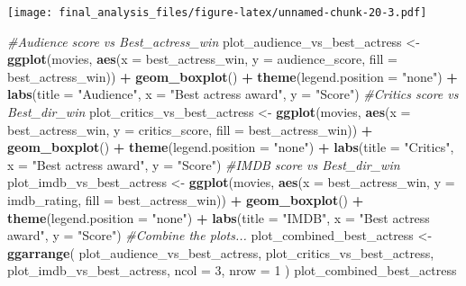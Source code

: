 \documentclass[]{article}
\newenvironment{Shaded}{\begin{snugshade}}{\end{snugshade}}
\newcommand{\CommentTok}[1]{\textcolor[rgb]{0.56,0.35,0.01}{\textit{#1}}}
\newcommand{\DataTypeTok}[1]{\textcolor[rgb]{0.13,0.29,0.53}{#1}}
\newcommand{\DecValTok}[1]{\textcolor[rgb]{0.00,0.00,0.81}{#1}}
\newcommand{\KeywordTok}[1]{\textcolor[rgb]{0.13,0.29,0.53}{\textbf{#1}}}
\newcommand{\NormalTok}[1]{#1}
\newcommand{\OperatorTok}[1]{\textcolor[rgb]{0.81,0.36,0.00}{\textbf{#1}}}
\newcommand{\StringTok}[1]{\textcolor[rgb]{0.31,0.60,0.02}{#1}}
\begin{document}
\texttt{[image: final\_analysis\_files/figure-latex/unnamed-chunk-20-3.pdf]}

\begin{Shaded}
\begin{Highlighting}[]
\CommentTok{#Audience score vs Best_actress_win}
\NormalTok{plot_audience_vs_best_actress <-}
\StringTok{  }\KeywordTok{ggplot}\NormalTok{(movies,}
         \KeywordTok{aes}\NormalTok{(}\DataTypeTok{x =}\NormalTok{ best_actress_win, }\DataTypeTok{y =}\NormalTok{ audience_score, }\DataTypeTok{fill =}\NormalTok{ best_actress_win)) }\OperatorTok{+}
\StringTok{  }\KeywordTok{geom_boxplot}\NormalTok{() }\OperatorTok{+}\StringTok{ }\KeywordTok{theme}\NormalTok{(}\DataTypeTok{legend.position =} \StringTok{"none"}\NormalTok{) }\OperatorTok{+}\StringTok{ }\KeywordTok{labs}\NormalTok{(}\DataTypeTok{title =} \StringTok{"Audience"}\NormalTok{, }\DataTypeTok{x =} \StringTok{"Best actress award"}\NormalTok{, }\DataTypeTok{y =} \StringTok{"Score"}\NormalTok{)}
\CommentTok{#Critics score vs Best_dir_win}
\NormalTok{plot_critics_vs_best_actress <-}
\StringTok{  }\KeywordTok{ggplot}\NormalTok{(movies,}
         \KeywordTok{aes}\NormalTok{(}\DataTypeTok{x =}\NormalTok{ best_actress_win, }\DataTypeTok{y =}\NormalTok{ critics_score, }\DataTypeTok{fill =}\NormalTok{ best_actress_win)) }\OperatorTok{+}
\StringTok{  }\KeywordTok{geom_boxplot}\NormalTok{() }\OperatorTok{+}\StringTok{ }\KeywordTok{theme}\NormalTok{(}\DataTypeTok{legend.position =} \StringTok{"none"}\NormalTok{) }\OperatorTok{+}\StringTok{ }\KeywordTok{labs}\NormalTok{(}\DataTypeTok{title =} \StringTok{"Critics"}\NormalTok{, }\DataTypeTok{x =} \StringTok{"Best actress award"}\NormalTok{, }\DataTypeTok{y =} \StringTok{"Score"}\NormalTok{)}
\CommentTok{#IMDB score vs Best_dir_win}
\NormalTok{plot_imdb_vs_best_actress <-}
\StringTok{  }\KeywordTok{ggplot}\NormalTok{(movies,}
         \KeywordTok{aes}\NormalTok{(}\DataTypeTok{x =}\NormalTok{ best_actress_win, }\DataTypeTok{y =}\NormalTok{ imdb_rating, }\DataTypeTok{fill =}\NormalTok{ best_actress_win)) }\OperatorTok{+}
\StringTok{  }\KeywordTok{geom_boxplot}\NormalTok{() }\OperatorTok{+}\StringTok{ }\KeywordTok{theme}\NormalTok{(}\DataTypeTok{legend.position =} \StringTok{"none"}\NormalTok{) }\OperatorTok{+}\StringTok{ }\KeywordTok{labs}\NormalTok{(}\DataTypeTok{title =} \StringTok{"IMDB"}\NormalTok{, }\DataTypeTok{x =} \StringTok{"Best actress award"}\NormalTok{, }\DataTypeTok{y =} \StringTok{"Score"}\NormalTok{)}
\CommentTok{#Combine the plots...}
\NormalTok{plot_combined_best_actress <-}
\StringTok{  }\KeywordTok{ggarrange}\NormalTok{(}
\NormalTok{    plot_audience_vs_best_actress,}
\NormalTok{    plot_critics_vs_best_actress,}
\NormalTok{    plot_imdb_vs_best_actress,}
    \DataTypeTok{ncol =} \DecValTok{3}\NormalTok{,}
    \DataTypeTok{nrow =} \DecValTok{1}
\NormalTok{  )}
\NormalTok{plot_combined_best_actress}
\end{Highlighting}
\end{Shaded}
\end{document}
